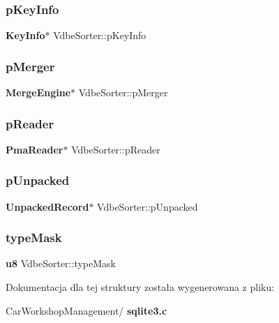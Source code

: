 \mbox{\label{struct_vdbe_sorter_a97c1a2aefd6dd093e82eddbf1bc9ffde}} 
\subsubsection{pKeyInfo}
{\footnotesize\ttfamily \textbf{ Key\+Info}$\ast$ Vdbe\+Sorter\+::p\+Key\+Info}

\mbox{\label{struct_vdbe_sorter_a8771886d3d97de93fd786b4ec9f2c185}} 
\subsubsection{pMerger}
{\footnotesize\ttfamily \textbf{ Merge\+Engine}$\ast$ Vdbe\+Sorter\+::p\+Merger}

\mbox{\label{struct_vdbe_sorter_ae5e5be145520adddd62d221dcdc1aa8e}} 
\subsubsection{pReader}
{\footnotesize\ttfamily \textbf{ Pma\+Reader}$\ast$ Vdbe\+Sorter\+::p\+Reader}

\mbox{\label{struct_vdbe_sorter_a0d85cdf1cf25c75cf90394d1bcfd27b9}} 
\subsubsection{pUnpacked}
{\footnotesize\ttfamily \textbf{ Unpacked\+Record}$\ast$ Vdbe\+Sorter\+::p\+Unpacked}

\mbox{\label{struct_vdbe_sorter_a75a7b43b4fe86ee6348dd576b4fb1c1f}} 
\subsubsection{typeMask}
{\footnotesize\ttfamily \textbf{ u8} Vdbe\+Sorter\+::type\+Mask}



Dokumentacja dla tej struktury została wygenerowana z pliku\+:\begin{DoxyCompactItemize}
\item 
Car\+Workshop\+Management/\textbf{ sqlite3.\+c}\end{DoxyCompactItemize}
